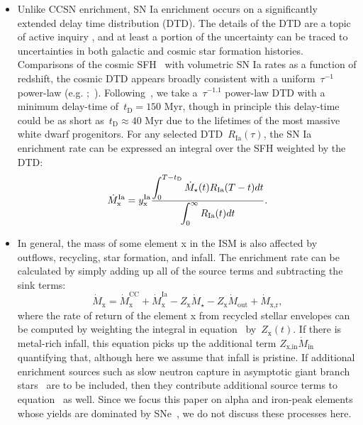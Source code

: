 \documentclass[ms.tex]{subfiles}
\begin{document}
\begin{itemize}
	\item Unlike CCSN enrichment, SN Ia enrichment occurs on a significantly
	extended delay time distribution (DTD).
	The details of the DTD are a topic of active inquiry
	\citep[e.g.][]{Greggio2005, Strolger2020, Freundlich2021}, and at least a
	portion of the uncertainty can be traced to uncertainties in both galactic
	and cosmic star formation histories.
	Comparisons of the cosmic SFH~\citep[e.g.][]{Madau2014, Madau2017} with
	volumetric SN Ia rates as a function of redshift, the cosmic DTD appears
	broadly consistent with a uniform~$\tau^{-1}$ power-law (e.g.
	\citealp*{Maoz2012a, Maoz2012b, Graur2013};~\citealp{Graur2014}).
	Following~\citet{Weinberg2017}, we take a~$\tau^{-1.1}$ power-law DTD with a
	minimum delay-time of~$t_\text{D} = 150$ Myr, though in principle this
	delay-time could be as short as~$t_\text{D} \approx 40$ Myr due to the
	lifetimes of the most massive white dwarf progenitors.
	For any selected DTD~$R_\text{Ia}(\tau)$, the SN Ia enrichment rate can be
	expressed an integral over the SFH weighted by the DTD:
	\begin{equation}
	\dot{M}_\text{x}^\text{Ia} = y_\text{x}^\text{Ia} \frac{\displaystyle{
		\int_0^{T - t_\text{D}} \dot{M}_\star(t) R_\text{Ia}(T - t) dt
	}}{\displaystyle{
		\int_0^\infty R_\text{Ia}(t) dt
	}}.
	\end{equation}

	\item In general, the mass of some element x in the ISM is also affected by
	outflows, recycling, star formation, and infall.
	The enrichment rate can be calculated by simply adding up all of the source
	terms and subtracting the sink terms:
	\begin{equation}
	\label{eq:enrichment_eq}
	\dot{M}_\text{x} = \dot{M}_\text{x}^\text{CC} + \dot{M}_\text{x}^\text{Ia}
	- Z_\text{x}\dot{M}_\star - Z_\text{x}\dot{M}_\text{out} +
	\dot{M}_\text{x,r},
	\end{equation}
	where the rate of return of the element x from recycled stellar envelopes
	can be computed by weighting the integral in equation~
	by~$Z_\text{x}(t)$.
	If there is metal-rich infall, this equation picks up the additional term
	$Z_\text{x,in}\dot{M}_\text{in}$ quantifying that, although here we assume
	that infall is pristine.
	If additional enrichment sources such as slow neutron capture in asymptotic
	giant branch stars~\citep[e.g.][]{Cristallo2011, Cristallo2015, Ventura2013,
	Ventura2014, Ventura2018, Ventura2020, Karakas2016, Karakas2018} are to be
	included, then they contribute additional source terms to
	equation~ as well.
	Since we focus this paper on alpha and iron-peak elements whose yields are
	dominated by SNe~\citep[e.g.][]{Johnson2019}, we do not discuss these
	processes here.

\end{itemize}
\end{document}
